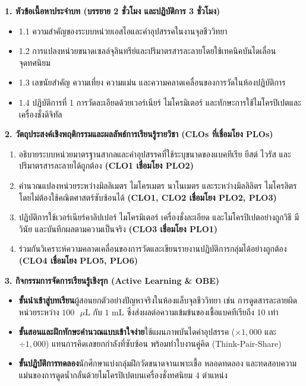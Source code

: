 \cleardoublepage
{}
\begin{planbox}
\noindent\textbf{1. หัวข้อเนื้อหาประจำบท (บรรยาย 2 ชั่วโมง และปฏิบัติการ 3 ชั่วโมง)}
\begin{itemize}
    \item 1.1 ความสำคัญของระบบหน่วยเอสไอและคำอุปสรรคในงานจุลชีววิทยา
    \item 1.2 การแปลงหน่วยขนาดเซลล์จุลินทรีย์และปริมาตรสารละลายโดยใช้เทคนิคบันไดเลื่อนจุดทศนิยม
    \item 1.3 เลขนัยสำคัญ ความเที่ยง ความแม่น และความคลาดเคลื่อนของการวัดในห้องปฏิบัติการ
    \item 1.4 ปฏิบัติการที่ 1 การวัดละเอียดด้วยเวอร์เนียร์ ไมโครมิเตอร์ และทักษะการใช้ไมโครปิเปตและเครื่องชั่งดิจิทัล
\end{itemize}

\noindent\textbf{2. วัตถุประสงค์เชิงพฤติกรรมและผลลัพธ์การเรียนรู้รายวิชา (CLOs ที่เชื่อมโยง PLOs)}
\begin{enumerate}
    \item อธิบายระบบหน่วยมาตรฐานสากลและคำอุปสรรคที่ใช้ระบุขนาดของแบคทีเรีย ยีสต์ ไวรัส และปริมาตรสารละลายได้ถูกต้อง \textbf{(CLO1 เชื่อมโยง PLO2)}
    \item คำนวณแปลงหน่วยระหว่างมิลลิเมตร ไมโครเมตร นาโนเมตร และระหว่างมิลลิลิตร ไมโครลิตร โดยไม่ต้องใช้คณิตศาสตร์ซับซ้อนได้ \textbf{(CLO1, CLO2 เชื่อมโยง PLO2, PLO3)}
    \item ปฏิบัติการใช้เวอร์เนียร์คาลิปเปอร์ ไมโครมิเตอร์ เครื่องชั่งละเอียด และไมโครปิเปตอย่างถูกวิธี มีวินัย และบันทึกผลตามความเป็นจริง \textbf{(CLO3 เชื่อมโยง PLO1)}
    \item ร่วมกันวิเคราะห์ความคลาดเคลื่อนของการวัดและเขียนรายงานปฏิบัติการกลุ่มได้อย่างถูกต้อง \textbf{(CLO4 เชื่อมโยง PLO5, PLO6)}
\end{enumerate}

\noindent\textbf{3. กิจกรรมการจัดการเรียนรู้เชิงรุก (Active Learning \& OBE)}
\begin{itemize}
    \item \textbf{ขั้นนำเข้าสู่บทเรียน}\quad ผู้สอนยกตัวอย่างปัญหาจริงในห้องแล็บจุลชีววิทยา เช่น การดูดสารละลายผิดหน่วยระหว่าง $100\text{ }\mu\text{L}$ กับ $1\text{ mL}$ ซึ่งส่งผลต่อความเข้มข้นของเชื้อแบคทีเรียถึง 10 เท่า
    \item \textbf{ขั้นสอนและฝึกทักษะคำนวณแบบเข้าใจง่าย}\quad ใช้แผนภาพบันไดคำอุปสรรค ($\times 1{,}000$ และ $\div 1{,}000$) แทนการคิดเลขยกกำลังที่ซับซ้อน พร้อมทำใบงานคู่คิด (Think-Pair-Share)
    \item \textbf{ขั้นปฏิบัติการทดลอง}\quad นักศึกษาแบ่งกลุ่มฝึกวัดขนาดจานเพาะเชื้อ หลอดทดลอง และทดสอบความแม่นของการดูดน้ำกลั่นด้วยไมโครปิเปตบนเครื่องชั่งทศนิยม 4 ตำแหน่ง
\end{itemize}


\end{planbox}
